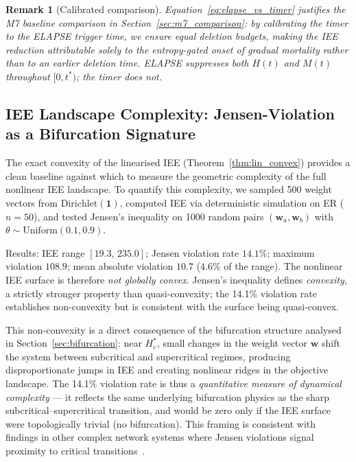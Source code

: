 \documentclass[review,12pt]{elsarticle}
\newcommand{\bfw}{\mathbf{w}}
\newcommand{\Hc}{H_c}
\newtheorem{remark}{Remark}
\begin{document}
\begin{remark}[Calibrated comparison]
\label{rem:m7}
Equation~\eqref{eq:elapse_vs_timer} justifies the M7 baseline comparison
in Section~\ref{sec:m7_comparison}: by calibrating the timer to the
ELAPSE trigger time, we ensure equal deletion budgets, making the IEE
reduction attributable solely to the entropy-gated onset of gradual
mortality rather than to an earlier deletion time.  ELAPSE suppresses both
$H(t)$ and $M(t)$ throughout $[0, t^*)$; the timer does not.
\end{remark}

\subsection{IEE Landscape Complexity: Jensen-Violation as a Bifurcation Signature}
\label{sec:convexity}

The exact convexity of the linearised IEE (Theorem~\ref{thm:lin_convex})
provides a clean baseline against which to measure the geometric complexity
of the full nonlinear IEE landscape.  To quantify this complexity, we sampled
500 weight vectors from $\mathrm{Dirichlet}(\mathbf{1})$, computed IEE via
deterministic simulation on ER ($n=50$), and tested Jensen's inequality on
1000 random pairs $(\bfw_a, \bfw_b)$ with $\theta \sim \mathrm{Uniform}(0.1,0.9)$.

Results: IEE range $[19.3,\,235.0]$; Jensen violation rate $\mathbf{14.1\%}$;
maximum violation $108.9$; mean absolute violation $10.7$ ($4.6\%$ of
the range).  The nonlinear IEE surface is therefore \emph{not globally convex}.
Jensen's inequality defines \emph{convexity}, a strictly stronger property
than quasi-convexity; the 14.1\% violation rate establishes non-convexity but
is consistent with the surface being quasi-convex.

This non-convexity is a direct consequence of the bifurcation structure
analysed in Section~\ref{sec:bifurcation}: near $\Hc^*$, small changes
in the weight vector $\bfw$ shift the system between subcritical and
supercritical regimes, producing disproportionate jumps in IEE and creating
nonlinear ridges in the objective landscape.  The 14.1\% violation rate
is thus a \emph{quantitative measure of dynamical complexity} --- it
reflects the same underlying bifurcation physics as the sharp
subcritical--supercritical transition, and would be zero only if the
IEE surface were topologically trivial (no bifurcation).  This framing
is consistent with findings in other complex network systems where
Jensen violations signal proximity to critical transitions~\cite{zhao2024multi}.
\end{document}
